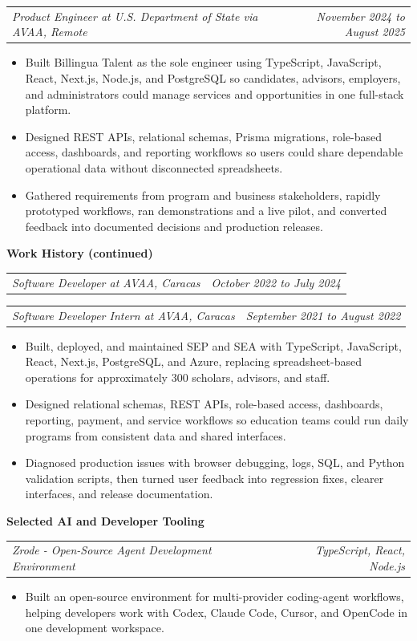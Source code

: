 \documentclass[10pt,letterpaper]{article}
\makeatletter
\newcommand{\bodyfont}{\fontsize{10.5}{15.75}\selectfont}
\newcommand{\sectiontitle}[1]{%
  \vspace{4pt}
  {\bodyfont\textbf{#1}}\par
  \nopagebreak[4]
  \vspace{2pt}
}
\newcommand{\roleline}[2]{%
  \begin{tabularx}{\textwidth}{@{}Xr@{}}
    \bodyfont\textit{#1} & \bodyfont\textit{#2}
  \end{tabularx}
  \nopagebreak[4]
  \vspace{1pt}
}
\makeatother
\begin{document}
\vspace{3pt}
\roleline{Product Engineer at U.S. Department of State via AVAA, Remote}{November 2024 to August 2025}
\begin{itemize}
  \item Built Billingua Talent as the sole engineer using TypeScript, JavaScript, React, Next.js, Node.js, and PostgreSQL so candidates, advisors, employers, and administrators could manage services and opportunities in one full-stack platform.
  \item Designed REST APIs, relational schemas, Prisma migrations, role-based access, dashboards, and reporting workflows so users could share dependable operational data without disconnected spreadsheets.
  \item Gathered requirements from program and business stakeholders, rapidly prototyped workflows, ran demonstrations and a live pilot, and converted feedback into documented decisions and production releases.
\end{itemize}

\newpage
\sectiontitle{Work History (continued)}

\roleline{Software Developer at AVAA, Caracas}{October 2022 to July 2024}
\roleline{Software Developer Intern at AVAA, Caracas}{September 2021 to August 2022}
\begin{itemize}
  \item Built, deployed, and maintained SEP and SEA with TypeScript, JavaScript, React, Next.js, PostgreSQL, and Azure, replacing spreadsheet-based operations for approximately 300 scholars, advisors, and staff.
  \item Designed relational schemas, REST APIs, role-based access, dashboards, reporting, payment, and service workflows so education teams could run daily programs from consistent data and shared interfaces.
  \item Diagnosed production issues with browser debugging, logs, SQL, and Python validation scripts, then turned user feedback into regression fixes, clearer interfaces, and release documentation.
\end{itemize}

\sectiontitle{Selected AI and Developer Tooling}

\roleline{Zrode - Open-Source Agent Development Environment}{TypeScript, React, Node.js}
\begin{itemize}
  \item Built an open-source environment for multi-provider coding-agent workflows, helping developers work with Codex, Claude Code, Cursor, and OpenCode in one development workspace.
\end{itemize}
\end{document}

